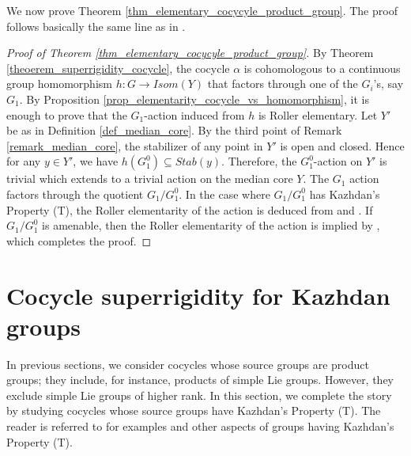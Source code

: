 \documentclass{amsart}
\numberwithin{equation}{section}
\theoremstyle{definition}
\begin{document}
We now prove Theorem \ref{thm_elementary_cocycyle_product_group}. The proof follows basically the same line as in \cite[Theorem C]{Fior_superrigidity}.
\begin{proof}[Proof of Theorem \ref{thm_elementary_cocycyle_product_group}]
 By Theorem \ref{theoerem_superrigidity_cocycle}, the cocycle $\alpha$ is cohomologous to a continuous group homomorphism $h:G\rightarrow Isom(Y)$ that factors through one of the $G_i$'s, say $G_1$. By Proposition \ref{prop_elementarity_cocycle_vs_homomorphism}, it is enough to prove that the $G_1$-action induced from $h$ is Roller elementary. Let $Y'$ be as in Definition \ref{def_median_core}. By the third point of Remark \ref{remark_median_core}, the stabilizer of any point in $Y'$ is open and closed. Hence for any $y\in Y'$, we have $h(G_1^0)\subseteq Stab(y)$. Therefore, the $G_1^0$-action on $Y'$ is trivial which extends to a trivial action on the median core $Y$. The $G_1$ action factors through the quotient $G_1/G_1^0$. In the case where $G_1/G_1^0$ has Kazhdan's Property (T), the Roller elementarity of the action is deduced from \cite[Theorem 1.2]{ChaDH_median}  and \cite[Corollary 2.17]{Fior_tits}. If $G_1/G_1^0$ is amenable, then the Roller elementarity of the action is implied by \cite[Theorem E]{Fior_tits}, which completes the proof.
\end{proof}


\section{Cocycle superrigidity for Kazhdan groups}\label{section_Kazhdan_group}
In previous sections, we consider cocycles whose source groups are product groups; they include, for instance, products of simple Lie groups. However, they exclude simple Lie groups of higher rank. In this section, we complete the story by studying cocycles whose source groups have Kazhdan's Property (T). The reader is referred to \cite{BHV} for examples and other aspects of groups having Kazhdan's Property (T).
\end{document}
